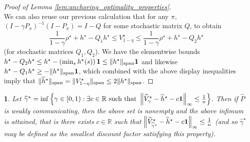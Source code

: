 \documentclass{article}
\theoremstyle{plain}
\theoremstyle{plain}
\newtheorem{lem}[thm]{\protect\lemmaname}
\theoremstyle{remark}
\theoremstyle{plain}
\theoremstyle{plain}
\providecommand{\lemmaname}{Lemma}
\newcommand{\R}{\mathbb{R}}
\newcommand{\Phat}{\widehat{P}}
\newcommand{\Vhat}{\widehat{V}}
\newcommand{\one}{\mathbf{1}}
\newcommand{\hhat}{\widehat{h}}
\newcommand{\htilde}{\widetilde{h}}
\newcommand{\empbod}{\widehat{\gamma}^\star}
\begin{document}
\begin{proof}[Proof of Lemma \ref{lem:anchoring_optimality_properties}]
\[    \]
    We can also reuse our previous calculation that for any $\pi$, $(I - \gamma P_{\pi})^{-1} (I - P_{\pi}) = I - Q$ for some stochastic matrix $Q$, to obtain
    \[
       \frac{1}{1-\gamma} \rho^\star + h^\star - Q_1 h^\star \leq  V^\star_{1-\eta} \leq \frac{1}{1-\gamma}\rho^\star + h^\star - Q_2 h^\star
    \]
    (for stochastic matrices $Q_1, Q_2$). We have the elementwise bounds $h^\star - Q_2 h^\star \leq h^\star - \left(\min_s h^\star(s)\right) \one \leq \spannorm{h^\star} \one$ and likewise $h^\star - Q_1 h^\star \geq - \spannorm{h^\star} \one$, which combined with the above display inequalities imply that $\spannorm{\htilde^\star} = \spannorm{V^\star_{1-\eta}} \leq 2 \spannorm{h^\star}$.    
\end{proof}


\begin{lem}
    \label{lem:prop_of_empbod}
    Let $\empbod = \inf \left \{\gamma \in [0, 1) : \exists c \in \R \text{ such that }\infnorm{\Vhat^\star_{\gamma} - \hhat^\star - c\one} \leq \frac{1}{n} \right \}$. Then if $\Phat$ is weakly communicating, then the above set is nonempty and the above infimum is attained, that is there exists $c \in \R$ such that $\infnorm{\Vhat^\star_{\empbod} - \hhat^\star - c\one} \leq \frac{1}{n}$ (and so $\empbod$ may be defined as the \textit{smallest} discount factor satisfying this property).
\end{lem}
\end{document}
